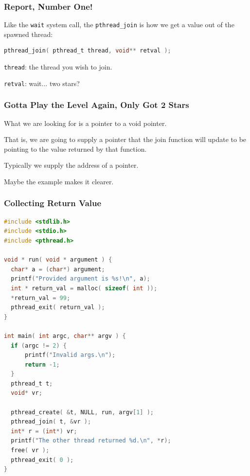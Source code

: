\begin{frame}[fragile]
	\frametitle{Report, Number One!}

	Like the \texttt{wait} system call, the \texttt{pthread\_join} is how we get a value out of the spawned thread:

	\begin{lstlisting}[language=C]
pthread_join( pthread_t thread, void** retval );
\end{lstlisting}

	\texttt{thread}: the thread you wish to join.

	\texttt{retval}: wait... two stars?

\end{frame}

\begin{frame}
	\frametitle{Gotta Play the Level Again, Only Got 2 Stars}

	What we are looking for is a pointer to a void pointer.

	That is, we are going to supply a pointer that the join function will update to be pointing to the value returned by that function.

	Typically we supply the address of a pointer.

	Maybe the example makes it clearer.
\end{frame}


\begin{frame}[fragile]
	\frametitle{Collecting Return Value}

	\begin{lstlisting}[language=C]
#include <stdlib.h>
#include <stdio.h>
#include <pthread.h>

void * run( void * argument ) { 
  char* a = (char*) argument;
  printf("Provided argument is %s!\n", a); 
  int * return_val = malloc( sizeof( int )); 
  *return_val = 99; 
  pthread_exit( return_val );
}

int main( int argc, char** argv ) { 
  if (argc != 2) {
      printf("Invalid args.\n");
      return -1; 
  }
  pthread_t t;
  void* vr; 
  
  pthread_create( &t, NULL, run, argv[1] );
  pthread_join( t, &vr );
  int* r = (int*) vr; 
  printf("The other thread returned %d.\n", *r);
  free( vr );
  pthread_exit( 0 );
}
\end{lstlisting}


\end{frame}







